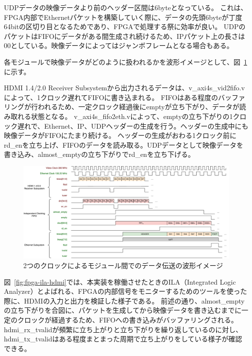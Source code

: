 UDPデータの映像データより前のヘッダー区間は6byteとなっている。
これは、FPGA内部でEthernetパケットを構築していく際に、データの先頭6byteが丁度64bitの区切り目となるためであり、FPGAで処理する祭に効率が良い。
UDPのパケットはFIFOにデータがある間生成され続けるため、IPパケット上の長さは00としている。映像データによってはジャンボフレームとなる場合もある。

各モジュールで映像データがどのように扱われるかを波形イメージとして、図~\ref{fig:fpga-first-pixel-waveform}に示す。

HDMI 1.4/2.0 Receiver Subsystemから出力されるデータは、v\_axi4s\_vid2fifo.vによって、1クロック遅れてFIFOに書き込まれる。
FIFOはある程度のバッファリングが行われるため、一定クロック経過後にemptyが立ち下がり、データが読み取れる状態となる。
v\_axi4s\_fifo2eth.vによって、emptyの立ち下がりの1クロック遅れで、Ethernet、IP、UDPヘッダーの生成を行う。ヘッダーの生成中にも映像データがFIFOにたまり続ける。
ヘッダーの生成がおわる1クロック前にrd\_enを立ち上げ、FIFOのデータを読み取る。UDPデータとして映像データを書き込み、almost\_emptyの立ち下がりでrd\_enを立ち下げる。

\begin{figure}[htbp]
  \begin{center}
    \includegraphics[bb=0 0 1118 502,width=22.5cm,angle=270]{img/fpga-first-pixel-waveform.pdf}
  \end{center}
  \caption{2つのクロックによるモジュール間でのデータ伝送の波形イメージ}
  \label{fig:fpga-first-pixel-waveform}
\end{figure}

図~\ref{fig:fpga-ila-hdmi}では、本実装を稼働させたときのILA（Integrated Logic Analyzer）とよばれる、FPGAの内部信号をモニターするためのツールを使った際に、HDMIの入力と出力を検証した様子である。
前述の通り、almost\_emptyの立ち下がりを合図に、パケットを生成してから映像データを書き込むまでに一定のクロックが経過するため、FIFOへの書き込みがバッファリングされる。
hdmi\_rx\_tvalidが頻繁に立ち上がりと立ち下がりを繰り返しているのに対し、hdmi\_tx\_tvalidはある程度まとまった周期で立ち上がりをしている様子が確認できる。

